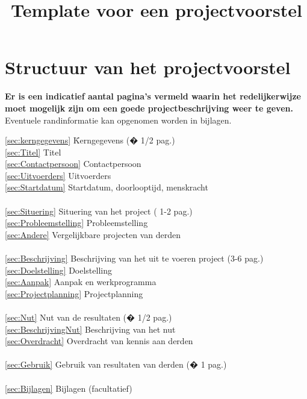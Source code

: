 \documentclass[10pt]{article}
\begin{document}
\title{Template voor een projectvoorstel}
\author{ }
\date{ }
\maketitle

\section*{Structuur van het projectvoorstel}

\textbf{Er is een indicatief aantal pagina's vermeld waarin het redelijkerwijze moet mogelijk zijn om een goede projectbeschrijving weer te geven.} Eventuele randinformatie kan opgenomen worden in bijlagen.

\begin{tabbing}
\ref{sec:kerngegevens} \= Kerngegevens   (� 1/2 pag.) \\
\> \ref{sec:Titel}	Titel \\
\> \ref{sec:Contactpersoon}	Contactpersoon \\
\> \ref{sec:Uitvoerders}	Uitvoerders \\
\> \ref{sec:Startdatum}	Startdatum, doorlooptijd, menskracht \\
 \\
\ref{sec:Situering} Situering van het project   ( 1-2 pag.) \\
\> \ref{sec:Probleemstelling}	Probleemstelling \\
\> \ref{sec:Andere}	Vergelijkbare projecten van derden \\
 \\
\ref{sec:Beschrijving}  Beschrijving van het uit te voeren project (3-6 pag.) \\
\> \ref{sec:Doelstelling}	Doelstelling \\
\> \ref{sec:Aanpak}	Aanpak en werkprogramma \\
\> \ref{sec:Projectplanning}	Projectplanning \\
 \\
\ref{sec:Nut} Nut van de resultaten (� 1/2 pag.) \\
\> \ref{sec:BeschrijvingNut}	Beschrijving van het nut \\
\> \ref{sec:Overdracht}	Overdracht van kennis aan derden \\
 \\
\ref{sec:Gebruik} Gebruik van resultaten van derden (� 1 pag.) \\
 \\
\ref{sec:Bijlagen} Bijlagen (facultatief) \\
 \\
\end{tabbing}
\end{document}
